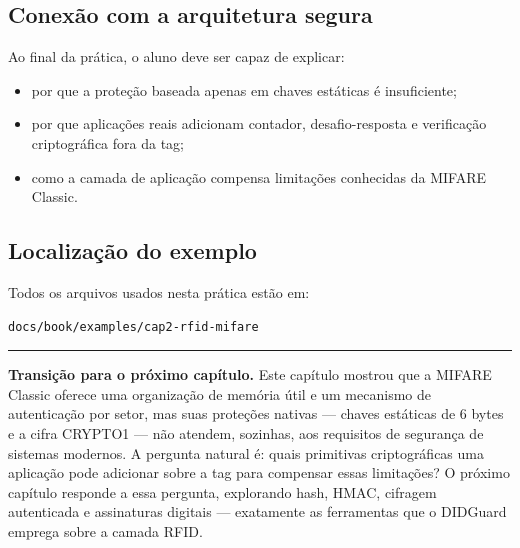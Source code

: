 \subsection{Conexão com a arquitetura segura}
Ao final da prática, o aluno deve ser capaz de explicar:
\begin{itemize}[leftmargin=*]
  \item por que a proteção baseada apenas em chaves estáticas é insuficiente;
  \item por que aplicações reais adicionam contador, desafio-resposta e verificação criptográfica fora da tag;
  \item como a camada de aplicação compensa limitações conhecidas da MIFARE Classic.
\end{itemize}

\subsection{Localização do exemplo}
Todos os arquivos usados nesta prática estão em:
\begin{verbatim}
docs/book/examples/cap2-rfid-mifare
\end{verbatim}

\vspace{1em}
\noindent\rule{\textwidth}{0.4pt}
\vspace{0.5em}
\noindent\textbf{Transição para o próximo capítulo.}
Este capítulo mostrou que a MIFARE Classic oferece uma organização de memória útil e um mecanismo de autenticação por setor, mas suas proteções nativas --- chaves estáticas de 6 bytes e a cifra CRYPTO1 --- não atendem, sozinhas, aos requisitos de segurança de sistemas modernos. A pergunta natural é: quais primitivas criptográficas uma aplicação pode adicionar sobre a tag para compensar essas limitações? O próximo capítulo responde a essa pergunta, explorando hash, HMAC, cifragem autenticada e assinaturas digitais --- exatamente as ferramentas que o DIDGuard emprega sobre a camada RFID.

